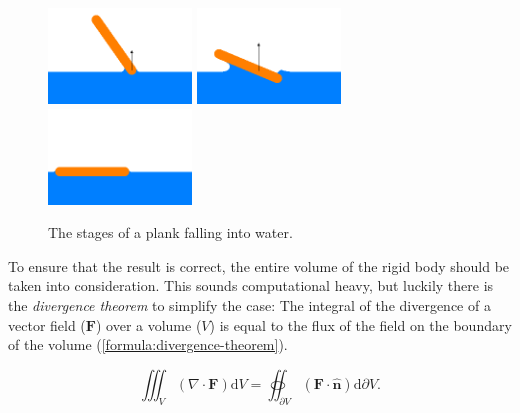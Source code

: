 \documentclass{article}
\begin{document}
\begin{figure}[h]
	\def\ih{1in}
	\centering
	\includegraphics[height=\ih]{../Thesis/figures/stages-of-a-plank-falling-into-water/1.png}
	\includegraphics[height=\ih]{../Thesis/figures/stages-of-a-plank-falling-into-water/2.png}
	\includegraphics[height=\ih]{../Thesis/figures/stages-of-a-plank-falling-into-water/3.png}
	\caption{The stages of a plank falling into water.}
	\label{fig:plank-falling-into-water-illustration}
\end{figure}

To ensure that the result is correct, the entire volume of the rigid body should be taken into consideration.
This sounds computational heavy, but luckily there is the \emph{divergence theorem} to simplify the case:
The integral of the divergence of a vector field ($\mathbf{F}$) over a volume ($V$) is equal to the flux of the field on the boundary of the volume (\ref{formula:divergence-theorem}).

\begin{equation}
	\iiint_{V}(\nabla\cdot\mathbf{F})\mathrm{d}V
	=
	\oiint_{\partial V}\left(\mathbf{F}\cdot\hat{\mathbf{n}}\right)\mathrm{d}\partial V
	.
	\label{formula:divergence-theorem}
\end{equation}
\end{document}
